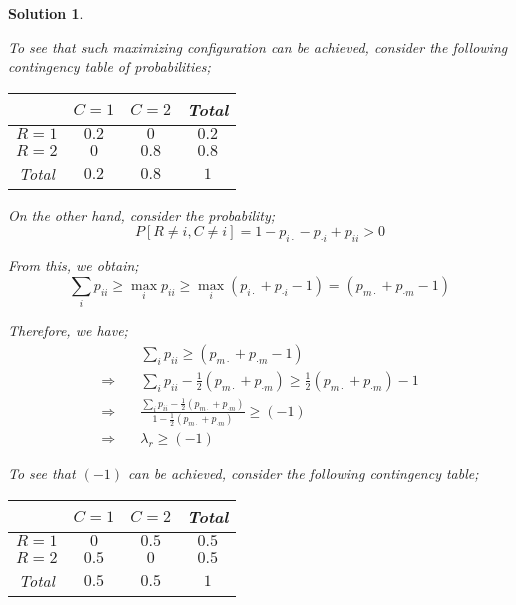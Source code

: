 \documentclass[12pt]{article}
\theoremstyle{problemstyle}
\newtheorem*{solution*}{Solution}
\begin{document}
\begin{solution*}
\begin{enumerate}
	To see that such maximizing configuration can be achieved, consider the following contingency table of probabilities;
	
	\begin{table}[H]
		\centering 
		\begin{tabular}{cccc}
			\toprule
			 & $C = 1$ & $C = 2$ & Total\\
			\midrule 
			$R = 1$ & $0.2$ & $0$ & $0.2$\\
			$R = 2$ & $0$ & $0.8$ & $0.8$\\
			Total & $0.2$ & $0.8$ & $1$\\
			\bottomrule
		\end{tabular}	
	\end{table}
	
	On the other hand, consider the probability;
	$$P\left[ R\neq i, C \neq i \right]=1-p_{i\cdot} -p_{\cdot i} + p_{ii} > 0$$
	
	From this, we obtain;
	$$\sum_{i} p_{ii} \geq \max_{i}p_{ii} \geq \max_{i}\left( p_{i\cdot} +p_{\cdot i} -1 \right) = \left( p_{m\cdot} +p_{\cdot m} -1 \right)$$
	
	Therefore, we have;
	\begin{align*}
		& \sum_{i} p_{ii} \geq \left( p_{m\cdot} +p_{\cdot m} -1 \right)\\
		\Rightarrow \quad & \sum_{i} p_{ii} - \frac{1}{2}\left( p_{m\cdot} +p_{\cdot m} \right) \geq \frac{1}{2}\left( p_{m\cdot} +p_{\cdot m} \right) -1\\
		\Rightarrow \quad & \frac{\sum_{i} p_{ii} - \frac{1}{2}\left( p_{m\cdot} +p_{\cdot m} \right)}{1 - \frac{1}{2}\left( p_{m\cdot} +p_{\cdot m} \right)} \geq (-1)\\
		\Rightarrow \quad & \lambda_r \geq (-1)
	\end{align*}
	
	To see that $(-1)$ can be achieved, consider the following contingency table;
	\begin{table}[H]
		\centering 
		\begin{tabular}{cccc}
			\toprule
			& $C = 1$ & $C = 2$ & Total\\
			\midrule 
			$R = 1$ & $0$ & $0.5$ & $0.5$\\
			$R = 2$ & $0.5$ & $0$ & $0.5$\\
			Total & $0.5$ & $0.5$ & $1$\\
			\bottomrule
		\end{tabular}	
	\end{table}
	

\end{enumerate}
\end{solution*}
\end{document}
